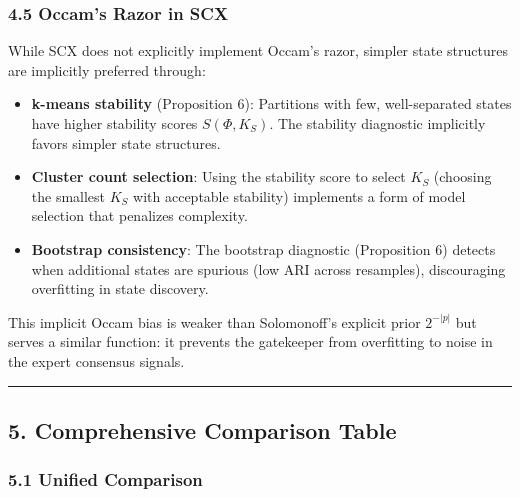 \documentclass[
  12pt,
]{ctexart}
\begin{document}
\subsubsection{4.5 Occam's Razor in SCX}\label{occams-razor-in-scx}

While SCX does not explicitly implement Occam's razor, simpler state
structures are implicitly preferred through:

\begin{itemize}
\item
  \textbf{k-means stability} (Proposition 6): Partitions with few,
  well-separated states have higher stability scores \(S(\Phi, K_S)\).
  The stability diagnostic implicitly favors simpler state structures.
\item
  \textbf{Cluster count selection}: Using the stability score to select
  \(K_S\) (choosing the smallest \(K_S\) with acceptable stability)
  implements a form of model selection that penalizes complexity.
\item
  \textbf{Bootstrap consistency}: The bootstrap diagnostic (Proposition
  6) detects when additional states are spurious (low ARI across
  resamples), discouraging overfitting in state discovery.
\end{itemize}

This implicit Occam bias is weaker than Solomonoff's explicit prior
\(2^{-|p|}\) but serves a similar function: it prevents the gatekeeper
from overfitting to noise in the expert consensus signals.

\begin{center}\rule{0.5\linewidth}{0.5pt}\end{center}

\subsection{5. Comprehensive Comparison
Table}\label{comprehensive-comparison-table}

\subsubsection{5.1 Unified Comparison}\label{unified-comparison}
\end{document}
